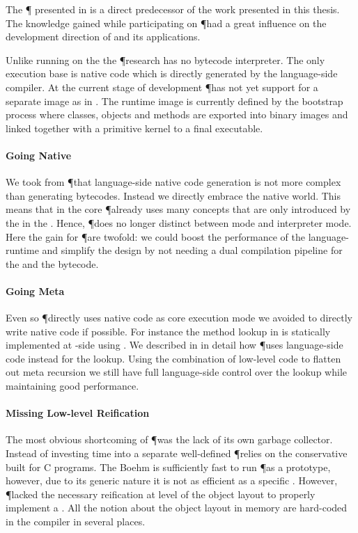 The \P \VM \cite{Verw11a} presented in  is a direct predecessor of the work presented in this thesis.
The knowledge gained while participating on \P had a great influence on the development direction of \B and its applications.

Unlike \PH running on the \Cog \VM the \P research \VM has no bytecode interpreter.
The only execution base is native code which is directly generated by the language-side compiler.
At the current stage of development \P has not yet support for a separate image as in \PH.
The runtime image is currently defined by the bootstrap process where classes, objects and methods are exported into binary images and linked together with a primitive kernel to a final executable.

\paragraph{Going Native}
We took from \P that language-side native code generation is not more complex than generating bytecodes.
Instead we directly embrace the native world.
This means that in the core \P already uses many concepts that are only introduced by the \JIT in the \Cog \VM.
Hence, \P does no longer distinct between \JIT mode and interpreter mode.
Here the gain for \P are twofold: we could boost the performance of the language-runtime and simplify the design by not needing a dual compilation pipeline for the \JIT and the bytecode.

\paragraph{Going Meta}
Even so \P directly uses native code as core execution mode we avoided to directly write native code if possible.
For instance the method lookup in \Cog is statically implemented at \VM-side using \Slang.
We described in  in detail how \P uses language-side code instead for the lookup.
Using the combination of low-level code to flatten out meta recursion we still have full language-side control over the lookup while maintaining good performance.

\paragraph{Missing Low-level Reification}
The most obvious shortcoming of \P was the lack of its own garbage collector.
Instead of investing time into a separate well-defined \GC \P relies on the conservative  built for C programs.
The Boehm \GC is sufficiently fast to run \P as a prototype, however, due to its generic nature it is not as efficient as a specific \GC.
However, \P lacked the necessary reification at level of the object layout to properly implement a \GC.
All the notion about the object layout in memory are hard-coded in the compiler in several places.

